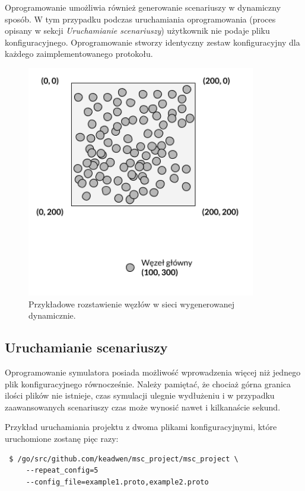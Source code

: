 \documentclass[a4paper,12pt,twoside,openany]{report}
\begin{document}
Oprogramowanie umożliwia również generowanie scenariuszy w dynamiczny sposób.
W tym przypadku podczas uruchamiania oprogramowania (proces opisany w sekcji \textit{Uruchamianie scenariuszy})
użytkownik nie podaje pliku konfiguracyjnego. Oprogramowanie stworzy identyczny zestaw konfiguracyjny
dla każdego zaimplementowanego protokołu.

\begin{figure}[H]
 \centering
 \includegraphics[width=10cm]{images/przykladowa_sieci_wygenerowana.png}
 \caption{Przykładowe rozstawienie węzłów w sieci wygenerowanej dynamicznie.}
\end{figure}

\subsection{Uruchamianie scenariuszy}

Oprogramowanie symulatora posiada możliwość wprowadzenia więcej niż jednego plik konfiguracyjnego równocześnie.
Należy pamiętać, że chociaż górna granica ilości plików nie istnieje, czas symulacji ulegnie wydłużeniu i w przypadku 
zaawansowanych scenariuszy czas może wynosić nawet i kilkanaście sekund.

Przykład uruchamiania projektu z dwoma plikami konfiguracyjnymi, które uruchomione zostanę pięc razy:

\begin{lstlisting}
 $ /go/src/github.com/keadwen/msc_project/msc_project \
     --repeat_config=5
     --config_file=example1.proto,example2.proto
\end{lstlisting}
\end{document}
